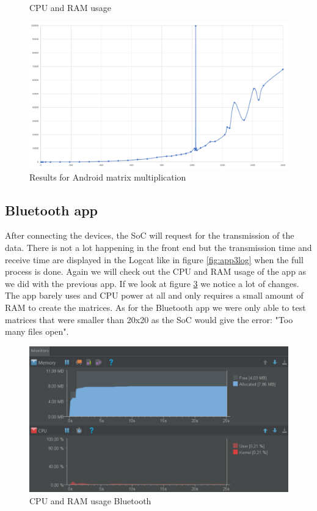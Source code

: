 \documentclass[a4paper, 11pt]{report}
\begin{document}
\begin{figure}[ht]
\begin{minipage}[t]{0.5\textwidth}
	\caption{CPU and RAM usage}\label{fig:app1usage}
	\end{minipage}
\end{figure}


\begin{figure}[ht]
\centering
\includegraphics[scale=0.35]{images/app1graph.pdf}
\caption{Results for Android matrix multiplication}\label{fig:app1Graph}
\end{figure}



	\subsection{Bluetooth app}
After connecting the devices, the SoC will request for the transmission of the data. There is not a lot happening in the front end but the transmission time and receive time are displayed in the Logcat like in figure \ref{fig:app3log} when the full process is done. Again we will check out the CPU and RAM usage of the app as we did with the previous app. If we look at figure \ref{fig:app3usage} we notice a lot of changes. The app barely uses and CPU power at all and only requires a small amount of RAM to create the matrices. As for the Bluetooth app we were only able to test matrices that were smaller than 20x20 as the SoC would give the error: "Too many files open".

\begin{figure}[ht]
\centering
\includegraphics[scale=0.3]{images/app3usage.pdf}
\caption{CPU and RAM usage Bluetooth}\label{fig:app3usage}
\end{figure}
\end{document}
